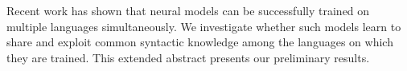 Recent work has shown that neural models can be successfully trained on multiple languages simultaneously. We investigate whether such models learn to share and exploit common syntactic knowledge among the languages on which they are trained. This extended abstract presents our preliminary results.
